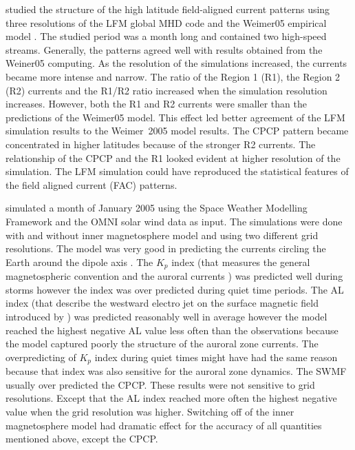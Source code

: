 \documentclass[linenumbers,draft]{agujournal}
\begin{document}
\citet{wiltberger17:_struc_high_latit_curren_magnet_ionos_model} studied the structure of the high latitude field-aligned current patterns using three resolutions of the LFM global MHD code and the Weimer05 empirical model \citep{weimer05:_improv_joule}. The studied period was a month long and contained two high-speed streams. Generally, the patterns agreed well with results obtained from the Weiner05 computing. As the resolution of the simulations increased, the currents became more intense and narrow. The ratio of the Region 1 (R1), the Region 2 (R2) currents and the R1/R2 ratio increased when the simulation resolution increases. However, both the R1 and R2 currents were smaller than the predictions of the Weimer05 model. This effect led better agreement of the LFM simulation results to the Weimer~2005 model results. The CPCP pattern became concentrated in higher latitudes because of the stronger R2 currents. The relationship of the CPCP and the R1 looked evident at higher resolution of the simulation. The LFM simulation could have reproduced the statistical features of the field aligned current (FAC) patterns. 

\citet{haiducek17:_swmf_global_magnet_simul_januar} simulated a month of January 2005 using the Space Weather Modelling Framework \citep[SWMF;][]{toth05:_space_weath_model_framew} and the OMNI solar wind data as input. The simulations were done with and without inner magnetosphere model and using two different grid resolutions. The model was very good in predicting the currents circling the Earth around the dipole axis \citep[SYM-H; http://wdc.kugi.kyoto-u.ac.jp/aeasy/asy.pdf;][]{iyemori90:_storm}. The $K_p$ index (that measures the general magnetospheric convention and the auroral currents \citep{bartels39,rostoker72:_geomag,thomsen04:_why_kp}) was predicted well during storms however the index was over predicted during quiet time periods. The AL index (that describe the westward electro jet on the surface magnetic field introduced by \citet{davis66:_auror_ae}) was predicted reasonably well in average however the model reached the highest negative AL value less often than the observations because the model captured poorly the structure of the auroral zone currents. The overpredicting of $K_p$ index during quiet times might have had the same reason because that index was also sensitive for the auroral zone dynamics. The SWMF usually over predicted the CPCP. These results were not sensitive to grid resolutions. Except that the AL index reached more often the highest negative value when the grid resolution was higher. Switching off of the inner magnetosphere model had dramatic effect for the accuracy of all quantities mentioned above, except the CPCP. 
\end{document}
